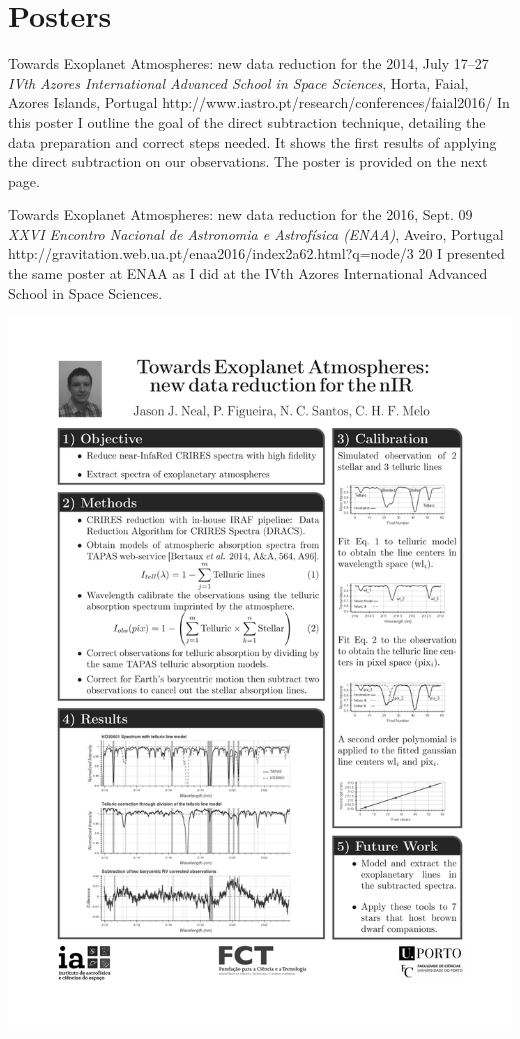 \section{Posters}\label{app_sec:posters}

 {Towards Exoplanet Atmospheres: new data reduction for the \nir{}}%
{2014, July 17--27}%
{\textit{IVth Azores International Advanced School in Space Sciences}, Horta, Faial, Azores Islands, Portugal}%
{http://www.iastro.pt/research/conferences/faial2016/}%
{}%
{In this poster I outline the goal of the direct subtraction technique, detailing the data preparation and correct steps needed. It shows the first results of applying the direct subtraction on our observations. The poster is provided on the next page.}%


 {Towards Exoplanet Atmospheres: new data reduction for the \nir{}}%
{2016, Sept. 09}%
{\textit{XXVI Encontro Nacional de Astronomia e Astrofísica (ENAA)}, Aveiro, Portugal}%
{ http://gravitation.web.ua.pt/enaa2016/index2a62.html?q=node/3}%
{20}%
{I presented the same poster at ENAA as I did at the IVth Azores International Advanced School in Space Sciences.}


{\centering \includegraphics[width=1\textwidth, keepaspectratio=true, page = 1, trim = 1.5cm 1cm 1.5cm 1cm, clip = true]{appendices/papers/Azores2016_grey}}